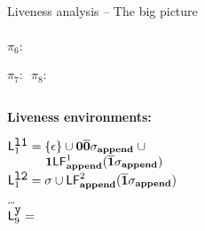 \begin{frame}[t]{Liveness analysis -- The big picture}
\begin{columns}[c]
\begin{column}[T]{0.6\textwidth}
{\begin{uprogram}
          \hspace*{-2.4cm} \hspace*{.05cm}   $\pi_6\!\!:\, $


          \hspace*{-2.7cm}  \hspace*{.05cm}   $\pi_7\!\!:\,$  
$\pi_8\!\!:\, $ 
\end{uprogram}}
 \end{column}
\end{columns}

\bigskip
\bigskip

\footnotesize
\begin{columns}[c]
 \begin{column}[T]{0.40\textwidth}
\scriptsize
\centerline{\bf Liveness environments:}

\bigskip

$\mathsf{L}_{{1}}^{\mbox{\tt l1}} = \{\epsilon\} \cup  \mathbf{0}\overline{\mathbf{0}}\sigma_{\mathbf{append}}\; \cup $\\
$\;\;\;\;\;\;\;\;\;\;\;\mathbf{1}\mathsf{LF}_{\mathit {\mathbf{append}}}^{1}( {\mathit {\overline{\mathbf{1}}}\sigma_{\mathbf{append}}})$\\
$\mathsf{L}_{{1}}^{\mbox{\tt l2}} = \sigma \cup \mathsf{LF}_{\mathit {\mathbf{append}}}^{2}( {\mathit {\overline{\mathbf{1}}}\sigma_{\mathbf{append}}})$\\
\ldots\\
$\mathsf{L}_{{9}}^{\mbox{\tt y}}  = $  \\



\end{column}
\end{columns}
\end{frame}
